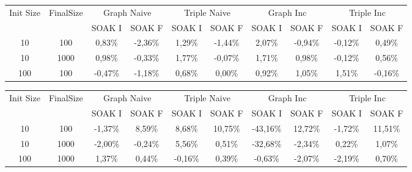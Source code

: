 \begin{sidewaystable}
	\centering
	\scriptsize
	\begin{tabular}{c|c|cc|cc|cc|cc} %
	  	\hline
		Init Size&FinalSize &\multicolumn{2}{c}{Graph Naive}  &\multicolumn{2}{c}{Triple Naive}&\multicolumn{2}{c}{Graph Inc}  &\multicolumn{2}{c}{Triple Inc}\\\
		&& SOAK I & SOAK F& SOAK I & SOAK F& SOAK I & SOAK F& SOAK I & SOAK F\\
		\hline
		\hline
		10&100&0,83\%&	-2,36\%&	1,29\%&	-1,44\%&	2,07\%&	-0,94\%&	-0,12\%&	0,49\%\\	
		10&1000&0,98\%&	-0,33\%&	1,77\%&	-0,07\%&	1,71\%&	0,98\%&	-0,12\%&	0,56\%\\
	
		100&100&	-0,47\%&	-1,18\%&	0,68\%&	0,00\%&	0,92\%&	1,05\%&	1,51\%&	-0,16\%\\
		\hline %
	\end{tabular}
	\caption[\textsc{Analyser} Investigation Stack - Level 1 \\ Step Response Test Average Latency Comparison]{\textsc{Analyser} Investigation Stack - Level 1 - Step Response Test average latency comparison }
	\label{tab:step_latency_comparisons_mean}	

	
	
	\begin{tabular}{c|c|cc|cc|cc|cc} %
	  	\hline
		Init Size&FinalSize &\multicolumn{2}{c}{Graph Naive}  &\multicolumn{2}{c}{Triple Naive}&\multicolumn{2}{c}{Graph Inc}  &\multicolumn{2}{c}{Triple Inc}\\\
		&& SOAK I & SOAK F& SOAK I & SOAK F& SOAK I & SOAK F& SOAK I & SOAK F\\
		\hline
		10&	100	& -1,37\%&	8,59\%&	8,68\%&	10,75\%&	-43,16\%&	12,72\%&	-1,72\%&	11,51\%	\\
		10	&1000	&-2,00\%&	-0,24\%&	5,56\%&	0,51\%&	-32,68\%&	-2,34\%&	0,22\%&	1,07\%	\\
		100	&1000&	1,37\%&	0,44\%&	-0,16\%&	0,39\%&	-0,63\%&	-2,07\%&	-2,19\%&	0,70\%	\\
										
		\hline %
	\end{tabular}
	\caption[\textsc{Analyser} Investigation Stack - Level 1 \\ Step Response Test Average Memory Comparison]{\textsc{Analyser} Investigation Stack - Level 1 - Step Response Test average memory comparison }
	\label{tab:step_memory_comparisons_mean}



\end{sidewaystable}
